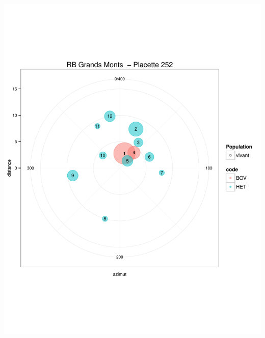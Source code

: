 \documentclass[a4paper]{book}\usepackage[]{graphicx}\usepackage[]{color}
\makeatletter
\def\maxwidth{ %
  \ifdim\Gin@nat@width>\linewidth
    \linewidth
  \else
    \Gin@nat@width
  \fi
}
\newenvironment{knitrout}{}{} %
\makeatother
\begin{document}
\begin{knitrout}
{\centering \includegraphics[width=\maxwidth]{Figures/PlanArbres-26} 

}





\end{knitrout}
\end{document}
